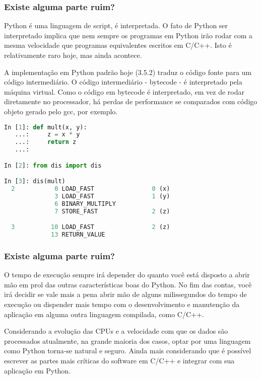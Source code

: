 \documentclass[aspectratio=169]{beamer}
\begin{document}
\begin{frame}
    \frametitle{Existe alguma parte ruim?}
    Python é uma linguagem de script, é interpretada. O fato de Python ser interpretado
implica que nem sempre os programas em Python irão rodar com a mesma velocidade que programas
equivalentes escritos em C/C++. Isto é relativamente raro hoje, mas ainda acontece.

    A implementação em Python padrão hoje (3.5.2) traduz o código fonte para um código
intermediário. O código intermediário - bytecode - é interpretado pela máquina virtual. Como
o código em bytecode é interpretado, em vez de rodar diretamente no processador, há perdas
de performance se comparados com código objeto gerado pelo gcc, por exemplo.
\end{frame}

\begin{frame}[fragile]
    \begin{lstlisting}[language=python]
In [1]: def mult(x, y):
   ...:     z = x * y
   ...:     return z
   ...:

In [2]: from dis import dis

In [3]: dis(mult)
  2           0 LOAD_FAST                0 (x)
              3 LOAD_FAST                1 (y)
              6 BINARY_MULTIPLY
              7 STORE_FAST               2 (z)

  3          10 LOAD_FAST                2 (z)
             13 RETURN_VALUE
    \end{lstlisting}
\end{frame}

\begin{frame}
    \frametitle{Existe alguma parte ruim?}
    O tempo de execução sempre irá depender do quanto você está disposto a abrir mão
em prol das outras características boas do Python. No fim das contas, você irá decidir
se vale mais a pena abrir mão de alguns milissegundos do tempo de execução ou dispender
mais tempo com o desenvolvimento e manutenção da aplicação em alguma outra linguagem
compilada, como C/C++.

    Considerando a evolução das CPUs e a velocidade com que os dados são processados
atualmente, na grande maioria dos casos, optar por uma linguagem como Python torna-se
natural e seguro. Ainda mais considerando que é possível escrever as partes mais críticas
do software em C/C++ e integrar com sua aplicação em Python.
\end{frame}
\end{document}
